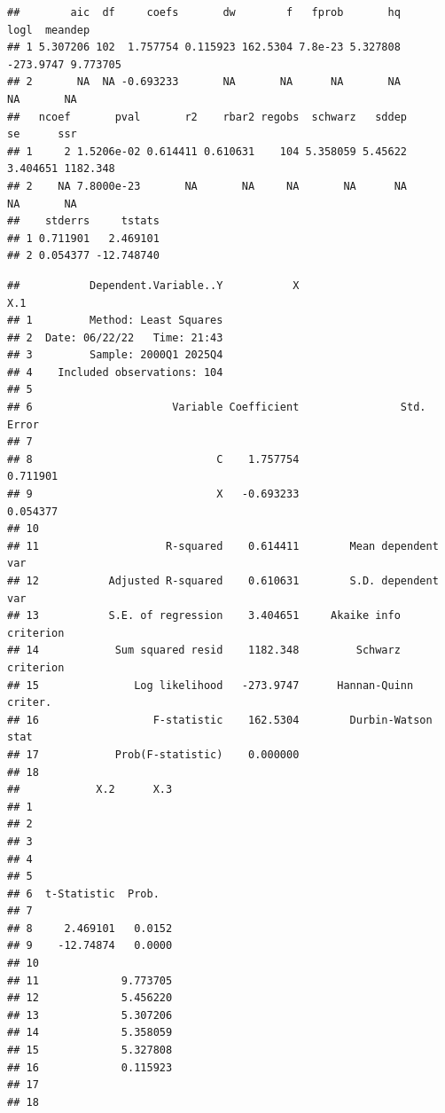 \documentclass[
]{article}
\begin{document}
\begin{verbatim}
##        aic  df     coefs       dw        f   fprob       hq      logl  meandep
## 1 5.307206 102  1.757754 0.115923 162.5304 7.8e-23 5.327808 -273.9747 9.773705
## 2       NA  NA -0.693233       NA       NA      NA       NA        NA       NA
##   ncoef       pval       r2    rbar2 regobs  schwarz   sddep       se      ssr
## 1     2 1.5206e-02 0.614411 0.610631    104 5.358059 5.45622 3.404651 1182.348
## 2    NA 7.8000e-23       NA       NA     NA       NA      NA       NA       NA
##    stderrs     tstats
## 1 0.711901   2.469101
## 2 0.054377 -12.748740
\end{verbatim}

\begin{verbatim}
##           Dependent.Variable..Y           X                       X.1
## 1         Method: Least Squares                                      
## 2  Date: 06/22/22   Time: 21:43                                      
## 3         Sample: 2000Q1 2025Q4                                      
## 4    Included observations: 104                                      
## 5                                                                    
## 6                      Variable Coefficient                Std. Error
## 7                                                                    
## 8                             C    1.757754                  0.711901
## 9                             X   -0.693233                  0.054377
## 10                                                                   
## 11                    R-squared    0.614411        Mean dependent var
## 12           Adjusted R-squared    0.610631        S.D. dependent var
## 13           S.E. of regression    3.404651     Akaike info criterion
## 14            Sum squared resid    1182.348         Schwarz criterion
## 15               Log likelihood   -273.9747      Hannan-Quinn criter.
## 16                  F-statistic    162.5304        Durbin-Watson stat
## 17            Prob(F-statistic)    0.000000                          
## 18                                                                   
##            X.2      X.3
## 1                      
## 2                      
## 3                      
## 4                      
## 5                      
## 6  t-Statistic  Prob.  
## 7                      
## 8     2.469101   0.0152
## 9    -12.74874   0.0000
## 10                     
## 11             9.773705
## 12             5.456220
## 13             5.307206
## 14             5.358059
## 15             5.327808
## 16             0.115923
## 17                     
## 18
\end{verbatim}
\end{document}
